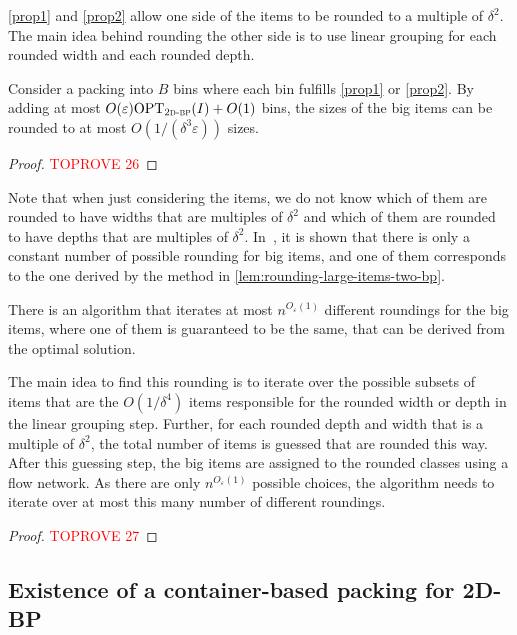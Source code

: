 \documentclass[a4paper,UKenglish,cleveref, autoref, thm-restate]{lipics-v2021}
\newcommand{\eps}{\varepsilon}
\newcommand{\opt}{\mathrm{OPT}}
\newcommand{\twobp}{\textsc{2d-bp}\xspace}
\newcommand{\bigy}{big\xspace}
\begin{document}
\cref{prop1} and \cref{prop2} allow one side of the items to be rounded to a multiple of $\delta^2$. The main idea behind rounding the other side is to use linear grouping for each rounded width and each rounded depth.

\begin{lemma}
\label{lem:rounding-large-items-two-bp}
Consider a packing into $B$ bins where each bin fulfills \cref{prop1} or \cref{prop2}.
By adding at most 
$O(\eps) \opt_{\twobp}(I) +O(1)$
bins, the sizes of the \bigy items can be rounded to at most $O(1/(\delta^3\eps))$ sizes.
\end{lemma}

\begin{proof}\textcolor{red}{TOPROVE 26}\end{proof}

Note that when just considering the items, we do not know which of them are rounded to have widths that are multiples of $\delta^2$ and which of them are rounded to have depths that are multiples of $\delta^2$. 
In~\cite{jansen2016new}, it is shown that there is only a constant number of possible rounding for \bigy items, and one of them corresponds to the one derived by the method in \cref{lem:rounding-large-items-two-bp}.

\begin{lemma}
\label{lem:iterate-roundings-two-bp}
There is an algorithm that iterates at most $n^{{O}_{\eps}(1)}$ different roundings for the \bigy items, where one of them is guaranteed to be the same, that can be derived from the optimal solution.
\end{lemma}

The main idea to find this rounding is to iterate over the possible subsets of items that are the $O(1/\delta^4)$ items responsible for the rounded width or depth in the linear grouping step. 
Further, for each rounded depth and width that is a multiple of $\delta^2$, the total number of items is guessed that are rounded this way.
After this guessing step, the \bigy items are assigned to the rounded classes using a flow network.
As there are only $n^{{O}_{\eps}(1)}$ possible choices, the algorithm needs to iterate over at most this many number of different roundings.



\begin{proof}\textcolor{red}{TOPROVE 27}\end{proof}



\subsection{Existence of a container-based packing for 2D-BP}
\end{document}
